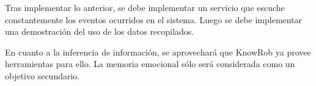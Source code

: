 Tras implementar lo anterior, se debe implementar un servicio que escuche constantemente los eventos ocurridos en el sistema. Luego se debe implementar una demostración del uso de los datos recopilados.

En cuanto a la inferencia de información, se aprovechará que KnowRob ya provee herramientas para ello. La memoria emocional sólo será considerada como un objetivo secundario.









